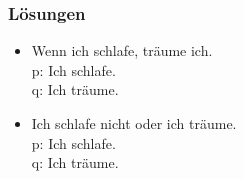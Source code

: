 \begin{frame}
\frametitle{Lösungen}

\begin{table}

\begin{minipage}{0.48\textwidth}
\centering
\begin{itemize}
\item[] \small{Wenn ich schlafe, träume ich.\\
               p: Ich schlafe.\\
               q: Ich träume.}
\end{itemize}
\end{minipage}
%
\begin{minipage}{0.48\textwidth}
\centering
\begin{itemize}
\item[] \small{Ich schlafe nicht oder ich träume.\\
               p: Ich schlafe.\\
               q: Ich träume.}
\end{itemize}
\end{minipage}
\end{table}

\end{frame}
%

